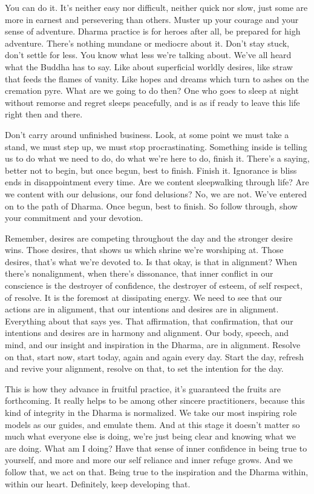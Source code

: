 \documentclass[12pt,openany]{book}
\begin{document}
You can do it. It’s neither easy nor difficult, neither quick nor slow, just some are more in earnest and persevering than others. \linebreak Muster up your courage and your sense of adventure. Dhar\-ma practice is for heroes after all, be prepared for high adventure. There’s nothing mundane or mediocre about it. Don't stay stuck, don't settle for less. You know what less we're talking about. We've all heard what the Buddha has to say. Like about superficial world\-ly desires, like straw that feeds the flames of vanity. Like hopes and dreams which turn to ashes on the cremation pyre. What are we going to do then? One who goes to sleep at night without remorse and regret sleeps peacefully, and is as if ready to leave this life right then and there.

Don't carry around unfinished business. Look, at some point we must take a stand, we must step up, we must stop procrastinating. Something inside is telling us to do what we need to do, do what we're here to do, finish it. There's a saying, better not to begin, but once begun, best to finish. Finish it. Ignorance is bliss ends in disappointment every time. Are we content sleepwalking through life? Are we content with our delusions, our fond delusions? No, we are not. We’ve entered on to the path of Dhar\-ma. Once begun, best to finish. So follow through, show your commitment and your devotion.

Remember, desires are competing throughout the day and the stronger desire wins. Those desires, that shows us which shrine we're worshiping at. Those desires, that's what we're devoted to. Is that okay, is that in alignment? When there's nonalignment, when there’s dissonance, that inner conflict in our conscience is the destroyer of confidence, the destroyer of esteem, of self respect, of resolve. It is the foremost at dissipating energy. We need to see that our actions are in alignment, that our intentions and desires are in alignment. Everything about that says yes. That affirmation, that confirmation, that our intentions and desires are in harmony and alignment. Our body, speech, and mind, and our insight and inspiration in the Dhar\-ma, are in alignment. Resolve on that, start now, start today, again and again every day. Start the day, refresh and revive your alignment, resolve on that, to set the intention for the day.

This is how they advance in fruitful practice, it's guaranteed the fruits are forthcoming. It really helps to be among other sincere practitioners, because this kind of integrity in the Dhar\-ma is normalized. We take our most inspiring role models as our guides, and emulate them. And at this stage it doesn't matter so much what everyone else is doing, we're just being clear and knowing what we are doing. What am I doing? Have that sense of inner confidence in being true to yourself, and more and more our self reliance and inner refuge grows. And we follow that, we act on that. Being true to the inspiration and the Dhar\-ma within, within our heart. Definitely, keep developing that.
\end{document}
